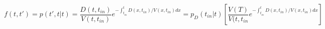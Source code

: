\begin{equation}
f(t,t') = p(t',t|t)=  \frac{D(t,t_{in})}{V(t,t_{in})}e^{-\int_{t_{in}}^t D(x,t_{in})/V(x,t_{in}) dx} = p_D(t_{in}|t)\left[ \frac{V(T)}{V(t,t_{in}} e^{-\int_{t_{in}}^t D(x,t_{in})/V(x,t_{in}) dx}\right]
\end{equation}